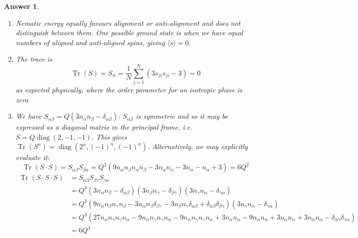 \documentclass[a4paper]{article}
\DeclareMathOperator{\Tr}{Tr}
\DeclareMathOperator{\diag}{diag}
\newtheorem{ans}{Answer}[section]
\theoremstyle{new}
\begin{document}
\begin{ans}
\begin{enumerate}[label=(\alph*)]
\begin{center}
\begin{tikzpicture}
\end{tikzpicture}
\end{center}
The phase transition is continuous since the order parameter changes continuously from 1 to 0 as we increase $T$ from below $T_c$. The system breaks its spatial isotropy at phase transition, i.e. free energy is isotropic but the ground state `chooses' a direction for $\mathbf{m}$. This is spontaneous symmetry breaking.
\item Nematic energy equally favours alignment or anti-alignment and does not distinguish between them. One possible ground state is when we have equal numbers of aligned and anti-aligned spins, giving $\langle s\rangle=0$.
\item The trace is
$$\Tr(S)=S_{ii}=\frac{1}{N}\sum_{j=1}^N(3s_{ji}s_{ji}-3)=0$$
as expected physically, where the order parameter for an isotropic phase is zero.
\item We have $S_{\alpha\beta}=Q(3n_\alpha n_\beta-\delta_{\alpha\beta})$. $S_{\alpha\beta}$ is symmetric and so it may be expressed as a diagonal matrix in the principal frame, i.e. $S=Q\diag(2,-1,-1)$. This gives $\Tr(S^n)=\diag(2^n,(-1)^n,(-1)^n)$. Alternatively, we may explicitly evaluate it:
$$\Tr(S\cdot S)=S_{\alpha\beta}S_{\beta\alpha}=Q^2(9n_\alpha n_\beta n_\alpha n_\beta-3n_\alpha n_\alpha-3n_\alpha-n_\alpha+3)=6Q^2$$
\begin{align}
    \Tr(S\cdot S\cdot S)&=S_{\alpha\beta}S_{\beta\gamma}S_{\gamma\alpha}\nonumber\\&=Q^3(3n_\alpha n_\beta-\delta_{\alpha\beta})(3n_\beta n_\gamma-\delta_{\beta\gamma})(3n_\gamma n_\alpha-\delta_{\gamma\alpha})\nonumber\\&=Q^3(9n_\alpha n_\beta n_\gamma n_\beta-3n_\alpha n_\beta\delta_{\beta\gamma}-3n_\beta n_\gamma\delta_{\alpha\beta}+\delta_{\alpha\beta}\delta_{\beta\gamma})(3n_\gamma n_\alpha-\delta_{\gamma\alpha})\nonumber\\&=Q^3(27 n_\alpha n_\gamma n_\gamma n_\alpha-9n_\alpha n_\gamma n_\gamma n_\alpha-9n_\alpha n_\gamma n_\gamma n_\alpha+3n_\alpha n_\alpha -9n_\alpha n_\alpha+3n_\alpha n_\alpha+3n_\alpha n_\alpha-\delta_{\alpha\gamma}\delta_{\gamma\alpha})\nonumber\\&=6Q^3\nonumber
\end{align}
\begin{align}

\end{align}
\end{enumerate}
\end{ans}
\end{document}
